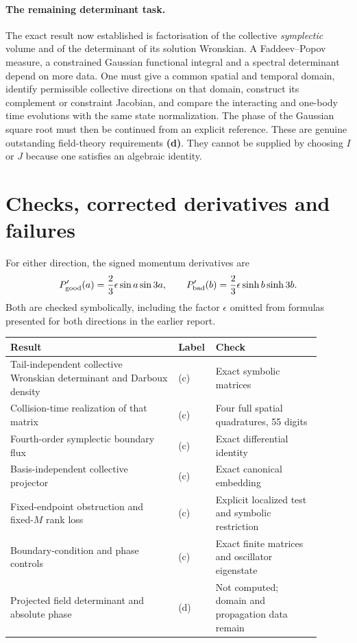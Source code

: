\documentclass[11pt]{article}
\newcommand{\Ld}{\textbf{(d)}}
\begin{document}
\paragraph{The remaining determinant task.}
The exact result now established is factorisation of the collective
\emph{symplectic} volume and of the determinant of its solution Wronskian.
A Faddeev--Popov measure, a constrained Gaussian functional integral and a
spectral determinant depend on more data. One must give a common spatial
and temporal domain, identify permissible collective directions on that
domain, construct its complement or constraint Jacobian, and compare the
interacting and one-body time evolutions with the same state normalization.
The phase of the Gaussian square root must then be continued from an
explicit reference. These are genuine outstanding field-theory requirements
\Ld. They cannot be supplied by choosing $I$ or $J$ because one satisfies
an algebraic identity.

\section{Checks, corrected derivatives and failures}
For either direction, the signed momentum derivatives are
\begin{equation}
 P'_{\rm good}(a)=\frac23\epsilon\sin a\sin3a,\qquad
 P'_{\rm bad}(b)=\frac23\epsilon\sinh b\sinh3b.
\end{equation}
Both are checked symbolically, including the factor $\epsilon$ omitted
from formulas presented for both directions in the earlier report.

\begin{longtable}{p{0.51\linewidth}p{0.07\linewidth}p{0.32\linewidth}}
\toprule Result & Label & Check\\\midrule
Tail-independent collective Wronskian determinant and Darboux density
 & (c) & Exact symbolic matrices\\
Collision-time realization of that matrix
 & (c) & Four full spatial quadratures, 55 digits\\
Fourth-order symplectic boundary flux
 & (c) & Exact differential identity\\
Basis-independent collective projector
 & (c) & Exact canonical embedding\\
Fixed-endpoint obstruction and fixed-$M$ rank loss
 & (c) & Explicit localized test and symbolic restriction\\
Boundary-condition and phase controls
 & (c) & Exact finite matrices and oscillator eigenstate\\
Projected field determinant and absolute phase
 & (d) & Not computed; domain and propagation data remain\\
\bottomrule
\end{longtable}
\end{document}

